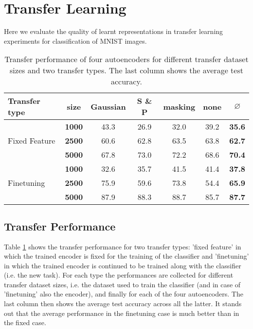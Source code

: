 \documentclass[10pt, a4paper]{article}
\begin{document}
	
	\section{Transfer Learning}
	Here we evaluate the quality of learnt representations in transfer learning experiments for classification of MNIST images.
	
	\begin{table}[b]
    \centering
    \begin{tabular}{|l||c||c|c|c|c||c|}
    \hline
    Transfer type & size & Gaussian & S \& P & masking & none & $\varnothing$  \\
    \hline\hline
    \multirow{3}{6em}{Fixed Feature} & \textbf{1000} & 43.3 & 26.9 & 32.0 & 39.2 & \textbf{35.6} \\
    & \textbf{2500} & 60.6 & 62.8 & 63.5 & 63.8 & \textbf{62.7} \\
    & \textbf{5000} & 67.8 & 73.0 & 72.2 & 68.6 & \textbf{70.4} \\
    \hline
    \multirow{3}{6em}{Finetuning} & \textbf{1000} & 32.6 & 35.7 & 41.5 & 41.4 & \textbf{37.8} \\
    & \textbf{2500} & 75.9 & 59.6 & 73.8 & 54.4 & \textbf{65.9} \\
    & \textbf{5000} & 87.9 & 88.3 & 88.7 & 85.7 & \textbf{87.7} \\
    \hline
    \end{tabular}
    \caption{Transfer performance of four autoencoders for different transfer dataset sizes and two transfer types. The last column shows the average test accuracy.}
    \label{table:imfidasi}
    \end{table}  
	
	\subsection{Transfer Performance}
	Table \ref{table:imfidasi} shows the transfer performance for two transfer types: 'fixed feature' in which the trained encoder is fixed for the training of the classifier and 'finetuning' in which the trained encoder is continued to be trained along with the classifier (i.e. the new task). For each type the performances are collected for different transfer dataset sizes, i.e. the dataset used to train the classifier (and in case of 'finetuning' also the encoder), and finally for each of the four autoencoders. The last column then shows the average test accuracy across all the latter. It stands out that the average performance in the finetuning case is much better than in the fixed case. 
	
\end{document}

